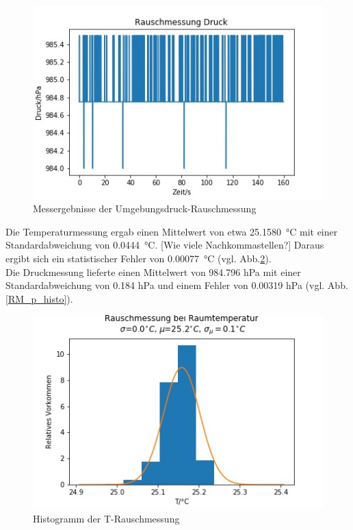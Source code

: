 \documentclass[]{article}
\begin{document}
\begin{figure}
	\begin{center}
			\includegraphics[scale=0.9]{Images/RauschmessungRT_p.jpg}
		\caption{Messergebnisse der Umgebungsdruck-Rauschmessung}
		\label{RM_p}
	\end{center}
\end{figure}
Die Temperaturmessung ergab einen Mittelwert von etwa \SI{25.1580}{\celsius} mit einer Standardabweichung von \SI{0.0444}{\celsius}. {\color{red}[Wie viele Nachkommastellen?]} Daraus ergibt sich ein statistischer Fehler von \SI{0.00077}{\celsius} (vgl. Abb.\ref{RM_T_histo}).\\
Die Druckmessung lieferte einen Mittelwert von 984.796 hPa mit einer Standardabweichung von 0.184 hPa und einem Fehler von 0.00319 hPa (vgl. Abb.\ref{RM_p_histo}).
\begin{figure}
	\begin{center}
		\includegraphics[scale=0.9]{Images/RauschmessungRT_T_histo.jpg}
		\caption{Histogramm der T-Rauschmessung}
		\label{RM_T_histo}
	\end{center}
\end{figure}
\end{document}
